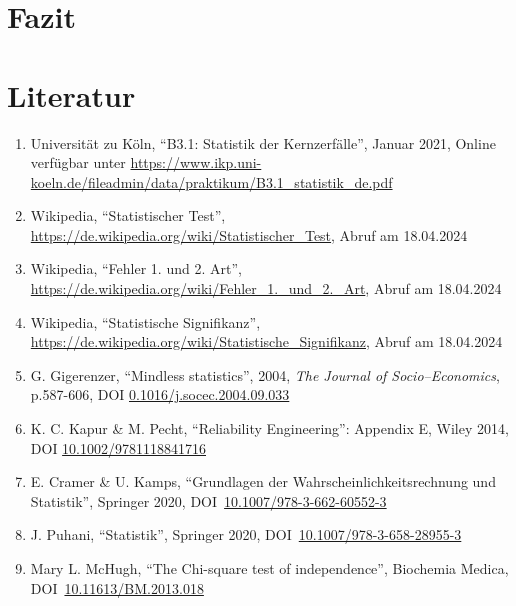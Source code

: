 \documentclass[12pt,a4paper]{scrartcl}
\numberwithin{equation}{section} %
\renewcommand{\[}{} %
\renewcommand{\]}{\noindent} %
\newcommand{\tightlist}{} %
\begin{document}
\clearpage
\hypertarget{fazit}{%
\section{Fazit}\label{fazit}}

\clearpage
\hypertarget{literatur}{%
\section{Literatur}\label{literatur}}

\begin{enumerate}
\def\labelenumi{\arabic{enumi}.}
\tightlist
\item
  Universität zu Köln, ``B3.1: Statistik der Kernzerfälle'', Januar
  2021, Online verfügbar unter
  \url{https://www.ikp.uni-koeln.de/fileadmin/data/praktikum/B3.1_statistik_de.pdf}
\item
  Wikipedia, ``Statistischer Test'',
  \url{https://de.wikipedia.org/wiki/Statistischer_Test}, Abruf am
  18.04.2024
\item
  Wikipedia, ``Fehler 1. und 2. Art'',
  \url{https://de.wikipedia.org/wiki/Fehler_1._und_2._Art}, Abruf am
  18.04.2024
\item
  Wikipedia, ``Statistische Signifikanz'',
  \url{https://de.wikipedia.org/wiki/Statistische_Signifikanz}, Abruf am
  18.04.2024
\item
  G. Gigerenzer, ``Mindless statistics'', 2004, \emph{The Journal of
  Socio--Economics}, p.587-606, DOI
  \href{https://doi.org/10.1016/j.socec.2004.09.033}{0.1016/j.socec.2004.09.033}
\item
  K. C. Kapur \& M. Pecht, ``Reliability Engineering'': Appendix E,
  Wiley 2014, DOI
  \href{https://doi.org/10.1002/9781118841716}{10.1002/9781118841716}
\item
  E. Cramer \& U. Kamps, ``Grundlagen der Wahrscheinlichkeitsrechnung
  und Statistik'', Springer 2020, DOI~\href{https://doi.org/10.1007/978-3-662-60552-3}{10.1007/978-3-662-60552-3}
\item
  J. Puhani, ``Statistik'', Springer 2020, DOI~\href{https://doi.org/10.1007/978-3-658-28955-3}{10.1007/978-3-658-28955-3}
\item
 Mary L. McHugh, ``The Chi-square test of independence'', Biochemia Medica, DOI~\href{https://doi.org/10.11613/BM.2013.018}{10.11613/BM.2013.018}
\end{enumerate}
\end{document}
